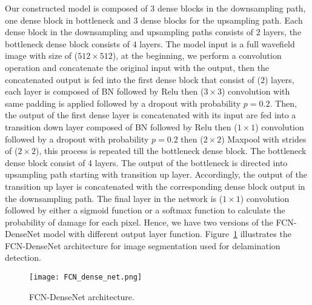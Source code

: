 	Our constructed model is composed of \(3\) dense blocks in the downsampling path, one dense block in bottleneck and 3 dense blocks for the upsampling path. 
	Each dense block in the downsampling and upsampling paths consists of \(2\) layers, the bottleneck dense block consists of \(4\) layers.
	The model input is a full wavefield image with size of (\(512\times 512\)), at the beginning, we perform a  convolution operation and concatenate the original input with the output, then the concatenated output is fed into the first dense block that consist of (\(2\)) layers, each layer is composed of BN followed by Relu then (\(3\times3\)) convolution with same padding is applied followed by a dropout with probability \(p = 0.2\).
	Then, the output of the first dense layer is concatenated with its input are fed into a transition down layer composed of BN followed by Relu then (\(1\times1\)) convolution followed by a dropout with probability \(p = 0.2\) then (\(2\times2\)) Maxpool with strides of (\(2\times2\)), this process is repeated till the bottleneck dense block.
	The bottleneck dense block consist of 4 layers.
	The output of the bottleneck is directed into upsampling path starting with transition up layer.
	Accordingly, the output of the transition up layer is concatenated with the corresponding dense block output in the downsampling path.
	The final layer in the network is  (\(1\times1\)) convolution followed by either a sigmoid function or a softmax function to calculate the probability of damage for each pixel.
	Hence, we have two versions of the FCN-DenseNet model with different output layer function.
	Figure~\ref{fcn} illustrates the FCN-DenseNet architecture for image segmentation used for delamination detection.
	\begin{figure} [h!]
		\begin{center}
			\texttt{[image: FCN\_dense\_net.png]}
		\end{center}
		\caption{FCN-DenseNet architecture.} 
		\label{fcn}
	\end{figure}



